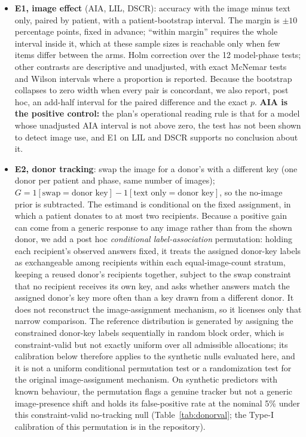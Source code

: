 \documentclass[conference]{IEEEtran}
\begin{document}
\begin{itemize}[leftmargin=*, itemsep=1pt, topsep=2pt]
    \item \textbf{E1, image effect} (AIA, LIL, DSCR): accuracy with the image minus text only, paired by patient, with a patient-bootstrap interval. The margin is $\pm10$ percentage points, fixed in advance; ``within margin'' requires the whole interval inside it, which at these sample sizes is reachable only when few items differ between the arms. Holm correction over the 12 model-phase tests; other contrasts are descriptive and unadjusted, with exact McNemar tests \citep{mcnemar1947note} and Wilson intervals \citep{wilson1927probable} where a proportion is reported. Because the bootstrap collapses to zero width when every pair is concordant, we also report, post hoc, an add-half interval for the paired difference \citep{agresti2005simple} and the exact $p$. \textbf{AIA is the positive control:} the plan's operational reading rule is that for a model whose unadjusted AIA interval is not above zero, the test has not been shown to detect image use, and E1 on LIL and DSCR supports no conclusion about it.
    \item \textbf{E2, donor tracking}: swap the image for a donor's with a different key (one donor per patient and phase, same number of images); $G=1[\text{swap}=\text{donor key}]-1[\text{text only}=\text{donor key}]$, so the no-image prior is subtracted. The estimand is conditional on the fixed assignment, in which a patient donates to at most two recipients. Because a positive gain can come from a generic response to any image rather than from the shown donor, we add a post hoc \emph{conditional label-association} permutation: holding each recipient's observed answers fixed, it treats the assigned donor-key labels as exchangeable among recipients within each equal-image-count stratum, keeping a reused donor's recipients together, subject to the swap constraint that no recipient receives its own key, and asks whether answers match the assigned donor's key more often than a key drawn from a different donor. It does not reconstruct the image-assignment mechanism, so it licenses only that narrow comparison. The reference distribution is generated by assigning the constrained donor-key labels sequentially in random block order, which is constraint-valid but not exactly uniform over all admissible allocations; its calibration below therefore applies to the synthetic nulls evaluated here, and it is not a uniform conditional permutation test or a randomization test for the original image-assignment mechanism. On synthetic predictors with known behaviour, the permutation flags a genuine tracker but not a generic image-presence shift and holds its false-positive rate at the nominal 5\% under this constraint-valid no-tracking null (Table~\ref{tab:donorval}; the Type-I calibration of this permutation is in the repository).

\end{itemize}
\end{document}
